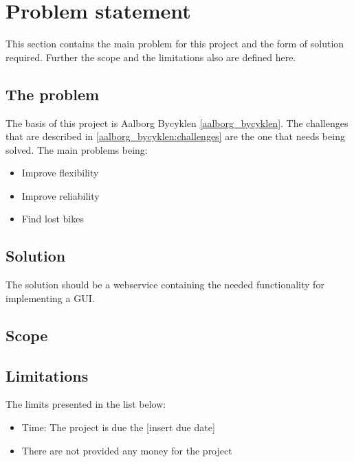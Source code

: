 \section{Problem statement}
This section contains the main problem for this project and the form of solution required.
Further the scope and the limitations also are defined here.
\subsection{The problem}
The basis of this project is Aalborg Bycyklen \cref{aalborg_bycyklen}.
The challenges that are described in \cref{aalborg_bycyklen:challenges} are the one that needs being solved.
The main problems being:
\begin{itemize}
\item Improve flexibility
\item Improve reliability
\item Find lost bikes
\end{itemize}

\subsection{Solution}
The solution should be a webservice containing the needed functionality for implementing a GUI.

\subsection{Scope}

\subsection{Limitations}
The limits presented in the list below:
\begin{itemize}
\item Time: The project is due the [insert due date]
\item There are not provided any money for the project
\end{itemize}